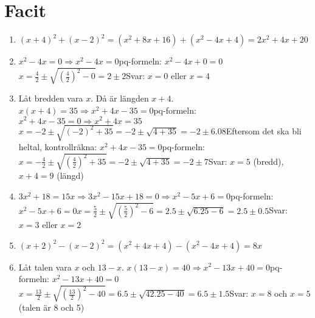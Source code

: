\documentclass[a4paper,11pt]{article}
\begin{document}
\section*{Facit}
\begin{enumerate}[label=\textbf{\arabic*.}]
    \item $(x+4)^2 + (x-2)^2 = (x^2+8x+16) + (x^2-4x+4) = 2x^2 + 4x + 20$
    \item $x^2 - 4x = 0 \Rightarrow x^2 - 4x = 0$\newline pq-formeln: $x^2 - 4x + 0 = 0$\newline $x = \frac{4}{2} \pm \sqrt{\left(\frac{4}{2}\right)^2 - 0} = 2 \pm 2$\newline Svar: $x=0$ eller $x=4$
    \item Låt bredden vara $x$. Då är längden $x+4$. $x(x+4)=35 \Rightarrow x^2+4x-35=0$\newline pq-formeln: $x^2 + 4x - 35 = 0 \Rightarrow x^2 + 4x = 35$\newline $x = -2 \pm \sqrt{(-2)^2 + 35} = -2 \pm \sqrt{4+35} = -2 \pm 6.08$\newline Eftersom det ska bli heltal, kontrollräkna: $x^2 + 4x - 35 = 0$\newline pq-formeln: $x = -\frac{4}{2} \pm \sqrt{\left(\frac{4}{2}\right)^2 + 35} = -2 \pm \sqrt{4+35} = -2 \pm 7$\newline Svar: $x=5$ (bredd), $x+4=9$ (längd)
    \item $3x^2 + 18 = 15x \Rightarrow 3x^2 - 15x + 18 = 0 \Rightarrow x^2 - 5x + 6 = 0$\newline pq-formeln: $x^2 - 5x + 6 = 0$\newline $x = \frac{5}{2} \pm \sqrt{\left(\frac{5}{2}\right)^2 - 6} = 2.5 \pm \sqrt{6.25 - 6} = 2.5 \pm 0.5$\newline Svar: $x=3$ eller $x=2$
    \item $(x+2)^2 - (x-2)^2 = (x^2+4x+4)-(x^2-4x+4)=8x$
    \item Låt talen vara $x$ och $13-x$. $x(13-x)=40 \Rightarrow x^2-13x+40=0$\newline pq-formeln: $x^2 - 13x + 40 = 0$\newline $x = \frac{13}{2} \pm \sqrt{\left(\frac{13}{2}\right)^2 - 40} = 6.5 \pm \sqrt{42.25 - 40} = 6.5 \pm 1.5$\newline Svar: $x=8$ och $x=5$ (talen är 8 och 5)
\end{enumerate}
\end{document}
